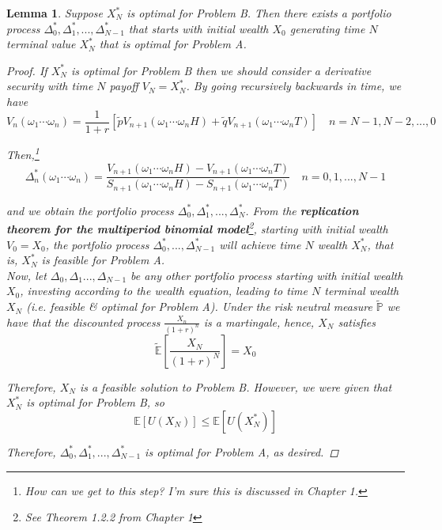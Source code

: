 \documentclass[12pt]{article}
\newtheorem{lemma}{Lemma}
\newlength\tindent
\renewcommand{\indent}{\hspace*{\tindent}}
\renewcommand{\P}{\mathbb P}
\newcommand{\E}{\mathbb E}
\begin{document}
\begin{lemma} Suppose $X^*_N$ is optimal for Problem B. Then there exists a portfolio process $\Delta^*_0, \Delta^*_1,..., \Delta^*_{N - 1}$ that starts with initial wealth $X_0$ generating time $N$ terminal value $X^*_N$ that is optimal for Problem A.

\begin{proof} If $X^*_N$ is optimal for Problem B then we should consider a derivative security with time $N$ payoff $V_N = X^*_N$. By going recursively backwards in time, we have
\begin{equation*}
	V_n(\omega_1\cdots\omega_n) = \frac{1}{1 + r}[\tilde{p}V_{n + 1}(\omega_1\cdots\omega_n H) + \tilde{q}V_{n + 1}(\omega_1\cdots\omega_n T)] \quad n =  N - 1, N - 2, ..., 0
\end{equation*}

Then,\footnote{How can we get to this step? I'm sure this is discussed in Chapter 1.}
\begin{equation*}
	\Delta^*_n(\omega_1\cdots\omega_n) = \frac{ V_{n + 1}(\omega_1\cdots\omega_n H) - V_{n + 1}(\omega_1\cdots\omega_n T) }{ S_{n + 1}(\omega_1\cdots\omega_n H) - S_{n + 1}(\omega_1\cdots\omega_n T)} \quad n = 0,1,..., N - 1
\end{equation*}

and we obtain the portfolio process $\Delta^*_0, \Delta^*_1, ..., \Delta^*_N$. From the {\bf replication theorem for the multiperiod binomial model}\footnote{See Theorem 1.2.2 from Chapter 1}, starting with initial wealth $V_0 = X_0$, the portfolio process $\Delta^*_0, ..., \Delta^*_{N - 1}$ will achieve time $N$ wealth $X^*_N$, that is, $X^*_N$ is feasible for Problem A. \\

\indent Now, let $\Delta_0, \Delta_1 ..., \Delta_{N - 1}$ be any other portfolio process starting with initial wealth $X_0$, investing according to the wealth equation, leading to time $N$ terminal wealth $X_N$ (i.e. feasible \& optimal for Problem A). Under the risk neutral measure $\tilde{\P}$ we have that the discounted process $\frac{X_n}{(1 + r)^n}$ is a martingale, hence, $X_N$ satisfies
\begin{equation*}
	\tilde{\E} \left[ \frac{X_N}{(1 + r)^N} \right] = X_0
\end{equation*}

\indent Therefore, $X_N$ is a feasible solution to Problem B. However, we were given that $X^*_N$ is optimal for Problem B, so
\begin{equation*}
	\E[U(X_N)] \leq \E[U(X^*_N)]
\end{equation*}

Therefore, $\Delta^*_0, \Delta^*_1, ..., \Delta^*_{N - 1}$ is optimal for Problem A, as desired.
\end{proof}
\end{lemma}
\end{document}
